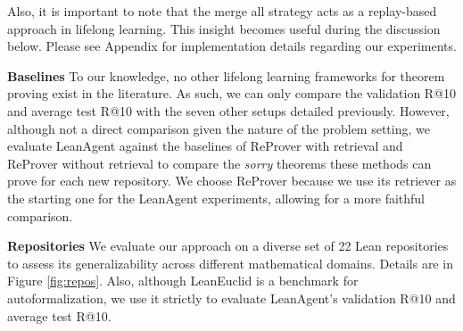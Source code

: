 \documentclass{article} %
\begin{document}
Also, it is important to note that the merge all strategy acts as a replay-based approach in lifelong learning. This insight becomes useful during the discussion below. Please see Appendix for implementation details regarding our experiments.

\textbf{Baselines} To our knowledge, no other lifelong learning frameworks for theorem proving exist in the literature. As such, we can only compare the validation R@10 and average test R@10 with the seven other setups detailed previously. However, although not a direct comparison given the nature of the problem setting, we evaluate LeanAgent against the baselines of ReProver with retrieval and ReProver without retrieval to compare the \textit{sorry} theorems these methods can prove for each new repository. We choose ReProver because we use its retriever as the starting one for the LeanAgent experiments, allowing for a more faithful comparison.

\textbf{Repositories} We evaluate our approach on a diverse set of 22 Lean repositories to assess its generalizability across different mathematical domains. Details are in Figure \ref{fig:repos}. Also, although LeanEuclid is a benchmark for autoformalization, we use it strictly to evaluate LeanAgent's validation R@10 and average test R@10.

\end{document}
